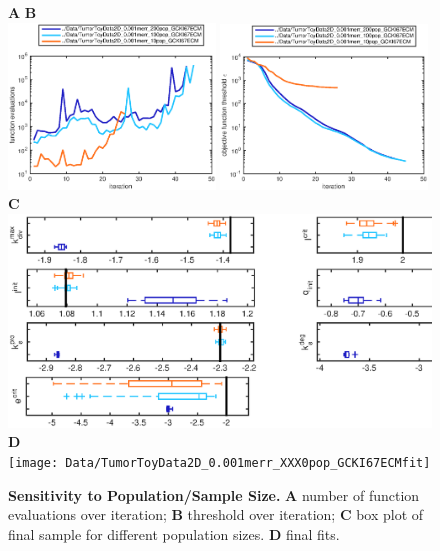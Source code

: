 \documentclass[10pt,letterpaper]{article}
\begin{document}
\begin{figure}[htbp]
\textbf{A} \hspace{180pt} \textbf{B} \\
\includegraphics[width=0.49\textwidth]{Data/TumorToyData2D_0.001merr_XXX0pop_GCKI67ECMfunctionEvaluations}
\includegraphics[width=0.49\textwidth]{Data/TumorToyData2D_0.001merr_XXX0pop_GCKI67ECMobjectiveFunction}\\
 \textbf{C} \\
\includegraphics[width=\textwidth]{Data/TumorToyData2D_0.001merr_XXX0pop_GCKI67ECMindependentBoxplots}\\
 \textbf{D} \\
\texttt{[image: Data/TumorToyData2D\_0.001merr\_XXX0pop\_GCKI67ECMfit]}\\
\caption{{\bf Sensitivity to Population/Sample Size.}
\textbf{A}  number of function evaluations over iteration; \textbf{B} threshold over iteration; \textbf{C} box plot of final sample for different population sizes. \textbf{D} final fits.}
\label{fig4}
\end{figure}
\end{document}
